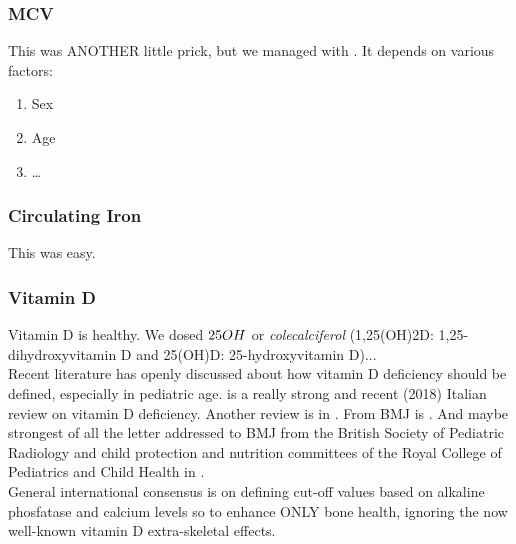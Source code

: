
\subsubsection{MCV}\label{sub:mcv}
This was ANOTHER little prick, but we managed with \cite{MCVferritincutoff}. It depends on various factors:

\begin{enumerate}
	\item Sex
	\item Age
	\item \dots
\end{enumerate}


\subsubsection{Circulating Iron}\label{sub:iron}
This was easy.


\subsubsection{Vitamin D}\label{sub:vitaminD}
Vitamin D is healthy. We dosed $25\-OH$ or \textit{colecalciferol} (1,25(OH)2D: 1,25-dihydroxyvitamin D and 25(OH)D: 25-hydroxyvitamin D)...\\
Recent literature has openly discussed about how vitamin D deficiency should be defined, especially in pediatric age. \cite{vitDcutoff1} is a really strong and recent (2018) Italian review on vitamin D deficiency. Another review is in \cite{vitDcutoff2}. From BMJ is \cite{vitDcutoff3}. And maybe strongest of all the letter addressed to BMJ from the British Society of Pediatric Radiology and child protection and nutrition committees of the Royal College of Pediatrics and Child Health in \cite{vitDcutoff_letter}.\\
General international consensus is on defining cut-off values based on alkaline phosfatase and calcium levels so to enhance ONLY bone health, ignoring the now well-known vitamin D extra-skeletal effects.

